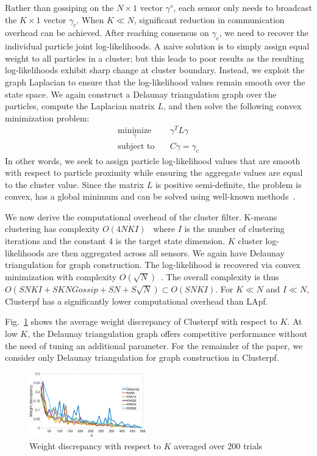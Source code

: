 \documentclass[10pt,letterpaper,final]{article}
\begin{document}
Rather than gossiping on the $N\times 1$ vector $\gamma^s$, each sensor only needs to broadcast the $K\times 1$ vector $\gamma_c$. When $K \ll N$, significant reduction in communication overhead can be achieved. After reaching consensus on $\gamma_c$, we need to recover the individual particle joint log-likelihoods. A naive solution is to simply assign equal weight to all particles in a cluster; but this leads to poor results as the resulting log-likelihoods exhibit sharp change at cluster boundary. Instead, we exploit the graph Laplacian to ensure that the log-likelihood values remain smooth over the state space. We again construct a Delaunay triangulation graph over the particles, compute the Laplacian matrix $L$, and then solve the following convex minimization problem:
\begin{align}
\underset{\gamma}{\text{minimize}}& \quad \gamma^TL\gamma  \\
\text{subject to}& \quad C\gamma = \gamma_c
\end{align}
In other words, we seek to assign particle log-likelihood values that are smooth with respect to particle proximity while ensuring the aggregate values are equal to the cluster value. Since the matrix $L$ is positive semi-definite, the problem is convex, has a global minimum and can be solved using well-known methods~\cite{Boyd2004}.

We now derive the computational overhead of the cluster filter. K-means clustering has complexity $O(4NKI)$~\cite{Hartigan1979} where $I$ is the number of clustering iterations and the constant $4$ is the target state dimension. $K$ cluster log-likelihoods are then aggregated across all sensors. We again have Delaunay triangulation for graph construction. The log-likelihood is recovered via convex minimization with complexity $O(\sqrt{N})$~\cite{Potra2000}. The overall complexity is thus $O(SNKI+SKNGossip + SN+S\sqrt{N})\subset O(SNKI)$. For $K\ll N$ and $I \ll N$, Clusterpf has a significantly lower computational overhead than LApf. 

Fig.~\ref{fig:Clusterpf_single_time} shows the average weight discrepancy of Clusterpf with respect to $K$. At low $K$, the Delaunay triangulation graph offers competitive performance without the need of tuning an additional parameter. For the remainder of the paper, we consider only Delaunay triangulation for graph construction in Clusterpf. 

\begin{figure}
\centering
\includegraphics[width=0.45\textwidth]{Figures/Clusterpf_single_time}
\caption{Weight discrepancy with respect to $K$ averaged over 200 trials}
\label{fig:Clusterpf_single_time}
\end{figure}
\end{document}
